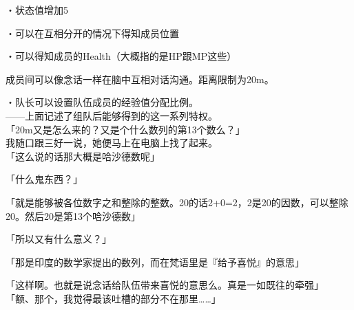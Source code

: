 ・状态值增加5%

・可以在互相分开的情况下得知成员位置

・可以得知成员的Health（大概指的是HP跟MP这些）

成员间可以像念话一样在脑中互相对话沟通。距离限制为20m。

・队长可以设置队伍成员的经验值分配比例。\\

——上面记述了组队后能够得到的这一系列特权。\\

「20m又是怎么来的？又是个什么数列的第13个数么？」\\

我随口跟三好一说，她便马上在电脑上找了起来。\\

「这么说的话那大概是哈沙德数呢」

「什么鬼东西？」

「就是能够被各位数字之和整除的整数。20的话2+0=2，2是20的因数，可以整除20。然后20是第13个哈沙德数」

「所以又有什么意义？」

「那是印度的数学家提出的数列，而在梵语里是『给予喜悦』的意思」

「这样啊。也就是说念话给队伍带来喜悦的意思么。真是一如既往的牵强」\\

「额、那个，我觉得最该吐槽的部分不在那里……」\\

